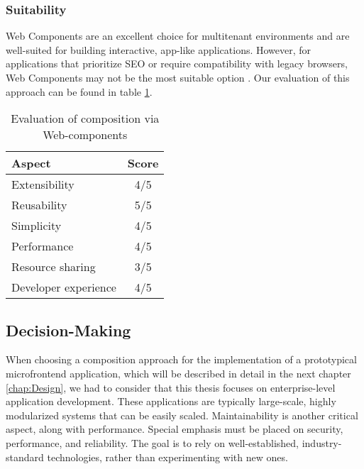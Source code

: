 \subsubsection{Suitability}
Web Components are an excellent choice for multitenant environments and are well-suited for building interactive, app-like applications. However, for applications that prioritize SEO or require compatibility with legacy browsers, Web Components may not be the most suitable option \cite{Geers}\cite{MezzaliraBuildingMf}. Our evaluation of this approach can be found in table \ref{table:web-compoents-evaluation}.

\begin{table}[h]
  \centering
  \begin{tabular}{|p{4cm}|c|}
    \hline
      \textbf{Aspect} & \textbf{Score} \\
    \hline
      Extensibility & 4/5 \\
    \hline
      Reusability & 5/5 \\
    \hline
      Simplicity & 4/5 \\
    \hline
      Performance & 4/5 \\
    \hline
      Resource sharing & 3/5 \\
    \hline
      Developer experience & 4/5 \\
    \hline
  \end{tabular}
  \caption{Evaluation of composition via Web-components}
  \label{table:web-compoents-evaluation}
\end{table}

\subsection{Decision-Making}
When choosing a composition approach for the implementation of a prototypical microfrontend application, which will be described in detail in the next chapter \ref{chap:Design}, we had to consider that this thesis focuses on enterprise-level application development. These applications are typically large-scale, highly modularized systems that can be easily scaled. Maintainability is another critical aspect, along with performance. Special emphasis must be placed on security, performance, and reliability. The goal is to rely on well-established, industry-standard technologies, rather than experimenting with new ones.

